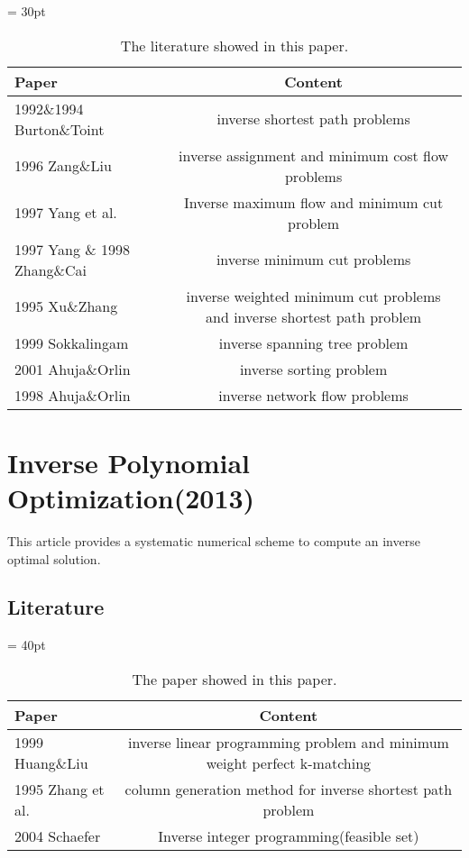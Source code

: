 \documentclass[UTF8]{article}
\begin{document}
\begin{table}[!h]

\tabcolsep = 30pt

\small\renewcommand{}

\caption{The literature showed in this paper.\label{tab:4}}

{\begin{tabular}{lc}
\hline
Paper & Content \\
\hline
1992\&1994 Burton\&Toint & inverse shortest path problems \\
\hline
1996 Zang\&Liu &  inverse assignment and minimum cost flow problems \\
\hline
1997 Yang et al. &  Inverse maximum flow and minimum cut problem \\
\hline
1997 Yang \& 1998 Zhang\&Cai & inverse minimum cut problems \\
\hline
1995 Xu\&Zhang & inverse weighted minimum cut problems and inverse shortest path problem\\
\hline
1999 Sokkalingam  & inverse spanning tree problem \\
\hline
2001 Ahuja\&Orlin & inverse sorting problem \\
\hline
1998 Ahuja\&Orlin & inverse network flow problems \\
\hline
\end{tabular}}
{}
\end{table}




\section{Inverse Polynomial Optimization(2013)}


This article provides a systematic numerical scheme to compute an inverse optimal solution.

\subsection{Literature}

\begin{table}[ht]

\tabcolsep = 40pt

\small\renewcommand{}

\caption{The paper showed in this paper.\label{tab:5}}

{\begin{tabular}{lc}
\hline
Paper & Content \\
\hline
1999 Huang\&Liu  & inverse linear programming problem and minimum weight perfect k-matching \\
\hline
1995 Zhang et al. & column generation method for inverse shortest path problem \\
\hline
2004 Schaefer & Inverse integer programming(feasible set) \\
\hline

\end{tabular}}
{}
\end{table}
\end{document}
